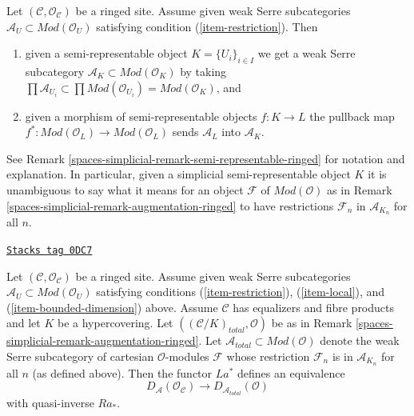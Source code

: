 Let $(\mathcal{C}, \mathcal{O}_\mathcal{C})$ be a ringed site.
Assume given weak Serre subcategories
$\mathcal{A}_U \subset \textit{Mod}(\mathcal{O}_U)$
satisfying condition (\ref{item-restriction}).
Then
\begin{enumerate}
\item given a semi-representable object $K = \{U_i\}_{i \in I}$
we get a weak Serre subcategory
$\mathcal{A}_K \subset \textit{Mod}(\mathcal{O}_K)$
by taking $\prod \mathcal{A}_{U_i} \subset
\prod \textit{Mod}(\mathcal{O}_{U_i}) = \textit{Mod}(\mathcal{O}_K)$, and
\item given a morphism of semi-representable objects
$f : K \to L$ the pullback map
$f^* : \textit{Mod}(\mathcal{O}_L) \to \textit{Mod}(\mathcal{O}_L)$
sends $\mathcal{A}_L$ into $\mathcal{A}_K$.
\end{enumerate}
See Remark \ref{spaces-simplicial-remark-semi-representable-ringed} for notation and
explanation. In particular, given a simplicial semi-representable object $K$
it is unambiguous to say what it means for an object $\mathcal{F}$ of
$\textit{Mod}(\mathcal{O})$ as in Remark \ref{spaces-simplicial-remark-augmentation-ringed}
to have restrictions $\mathcal{F}_n$ in
$\mathcal{A}_{K_n}$ for all $n$.

\begin{lemma}
\label{spaces-simplicial-lemma-hypercovering-equivalence-modules}
\href{https://stacks.math.columbia.edu/tag/0DC7}{\texttt{Stacks tag 0DC7}}

Let $(\mathcal{C}, \mathcal{O}_\mathcal{C})$ be a ringed site.
Assume given weak Serre subcategories
$\mathcal{A}_U \subset \textit{Mod}(\mathcal{O}_U)$
satisfying conditions (\ref{item-restriction}),
(\ref{item-local}), and (\ref{item-bounded-dimension}) above.
Assume $\mathcal{C}$ has equalizers and fibre products and
let $K$ be a hypercovering.
Let $((\mathcal{C}/K)_{total}, \mathcal{O})$ be as in
Remark \ref{spaces-simplicial-remark-augmentation-ringed}.
Let $\mathcal{A}_{total} \subset \textit{Mod}(\mathcal{O})$
denote the weak Serre subcategory of cartesian $\mathcal{O}$-modules
$\mathcal{F}$ whose restriction $\mathcal{F}_n$ is in
$\mathcal{A}_{K_n}$ for all $n$ (as defined above).
Then the functor $La^*$ defines an equivalence
$$
D_\mathcal{A}(\mathcal{O}_\mathcal{C})
\longrightarrow
D_{\mathcal{A}_{total}}(\mathcal{O})
$$
with quasi-inverse $Ra_*$.
\end{lemma}

